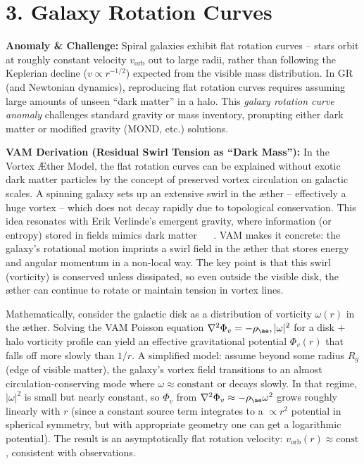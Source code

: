 \documentclass[a4paper, aps,preprint,superscriptaddress, 12pt]{revtex4}
\begin{document}
\section*{3. Galaxy Rotation Curves}

\textbf{Anomaly \& Challenge: } Spiral galaxies exhibit flat rotation curves – stars orbit at roughly constant velocity $v_{\text{orb}}$ out to large radii, rather than following the Keplerian decline ($v \propto r^{-1/2}$) expected from the visible mass distribution. In GR (and Newtonian dynamics), reproducing flat rotation curves requires assuming large amounts of unseen “dark matter” in a halo. This \textit{galaxy rotation curve anomaly} challenges standard gravity or mass inventory, prompting either dark matter or modified gravity (MOND, etc.) solutions.


\textbf{VAM Derivation (Residual Swirl Tension as “Dark Mass”):} In the Vortex Æther Model, the flat rotation curves can be explained without exotic dark matter particles by the concept of preserved vortex circulation on galactic scales. A spinning galaxy sets up an extensive swirl in the æther – effectively a huge vortex – which does not decay rapidly due to topological conservation. This idea resonates with Erik Verlinde’s emergent gravity, where information (or entropy) stored in fields mimics dark matter~\cite{Iskandarani2025c} ~\cite{Iskandarani2025c} . VAM makes it concrete: the galaxy’s rotational motion imprints a swirl field in the æther that stores energy and angular momentum in a non-local way. The key point is that this swirl (vorticity) is conserved unless dissipated, so even outside the visible disk, the æther can continue to rotate or maintain tension in vortex lines.


Mathematically, consider the galactic disk as a distribution of vorticity $\omega(r)$ in the æther. Solving the VAM Poisson equation $\nabla^2 \Phi_v = -\rho_{\ae},|\omega|^2$ for a disk + halo vorticity profile can yield an effective gravitational potential $\Phi_v(r)$ that falls off more slowly than $1/r$. A simplified model: assume beyond some radius $R_g$ (edge of visible matter), the galaxy’s vortex field transitions to an almost circulation-conserving mode where $\omega \approx \text{constant}$ or decays slowly. In that regime, $|\omega|^2$ is small but nearly constant, so $\Phi_v$ from $\nabla^2 \Phi_v \approx -\rho_{\ae}\omega^2$ grows roughly linearly with $r$ (since a constant source term integrates to a $\propto r^2$ potential in spherical symmetry, but with appropriate geometry one can get a logarithmic potential). The result is an asymptotically flat rotation velocity: $v_{\text{orb}}(r) \approx \text{const}$, consistent with observations.
\end{document}
